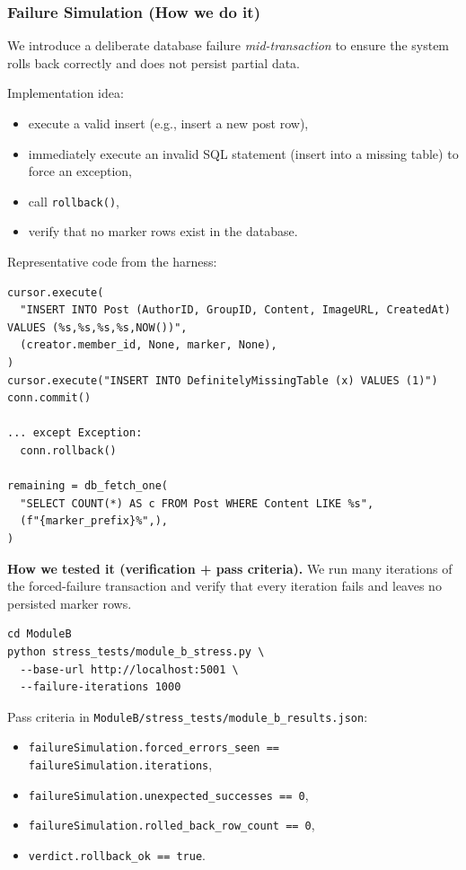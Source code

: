 \documentclass[12pt,a4paper]{article}
\begin{document}
\subsubsection{Failure Simulation (How we do it)}
We introduce a deliberate database failure \emph{mid-transaction} to ensure the system rolls back correctly and does not persist partial data.

Implementation idea:
\begin{itemize}[noitemsep]
  \item execute a valid insert (e.g., insert a new post row),
  \item immediately execute an invalid SQL statement (insert into a missing table) to force an exception,
  \item call \texttt{rollback()},
  \item verify that no marker rows exist in the database.
\end{itemize}

Representative code from the harness:
\begin{lstlisting}[style=python, caption={Failure simulation + rollback verification in module\_b\_stress.py (representative)}]
cursor.execute(
  "INSERT INTO Post (AuthorID, GroupID, Content, ImageURL, CreatedAt) VALUES (%s,%s,%s,%s,NOW())",
  (creator.member_id, None, marker, None),
)
cursor.execute("INSERT INTO DefinitelyMissingTable (x) VALUES (1)")
conn.commit()

... except Exception:
  conn.rollback()

remaining = db_fetch_one(
  "SELECT COUNT(*) AS c FROM Post WHERE Content LIKE %s",
  (f"{marker_prefix}%",),
)
\end{lstlisting}

\textbf{How we tested it (verification + pass criteria).}
We run many iterations of the forced-failure transaction and verify that every iteration fails and leaves no persisted marker rows.

\begin{lstlisting}[basicstyle=\ttfamily\small, caption={Failure-simulation test run command (Module B)}]
cd ModuleB
python stress_tests/module_b_stress.py \
  --base-url http://localhost:5001 \
  --failure-iterations 1000
\end{lstlisting}

Pass criteria in \texttt{ModuleB/stress\_tests/module\_b\_results.json}:
\begin{itemize}[noitemsep]
  \item \texttt{failureSimulation.forced\_errors\_seen == failureSimulation.iterations},
  \item \texttt{failureSimulation.unexpected\_successes == 0},
  \item \texttt{failureSimulation.rolled\_back\_row\_count == 0},
  \item \texttt{verdict.rollback\_ok == true}.
\end{itemize}
\end{document}

